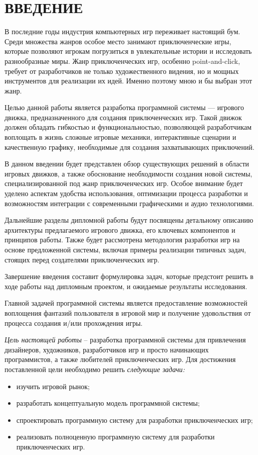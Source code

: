 \section*{ВВЕДЕНИЕ}

В последние годы индустрия компьютерных игр переживает настоящий бум. Среди множества жанров особое место занимают приключенческие игры, которые позволяют игрокам погрузиться в увлекательные истории и исследовать разнообразные миры. Жанр приключенческих игр, особенно point-and-click, требует от разработчиков не только художественного видения, но и мощных инструментов для реализации их идей. Именно поэтому мною и бы выбран этот жанр.

Целью данной работы является разработка программной системы — игрового движка, предназначенного для создания приключенческих игр. Такой движок должен обладать гибкостью и функциональностью, позволяющей разработчикам воплощать в жизнь сложные игровые механики, интерактивные сценарии и качественную графику, необходимые для создания захватывающих приключений.

В данном введении будет представлен обзор существующих решений в области игровых движков, а также обоснование необходимости создания новой системы, специализированной под жанр приключенческих игр. Особое внимание будет уделено аспектам удобства использования, оптимизации процесса разработки и возможностям интеграции с современными графическими и аудио технологиями.

Дальнейшие разделы дипломной работы будут посвящены детальному описанию архитектуры предлагаемого игрового движка, его ключевых компонентов и принципов работы. Также будет рассмотрена методология разработки игр на основе предложенной системы, включая примеры реализации типичных задач, стоящих перед создателями приключенческих игр.

Завершение введения составит формулировка задач, которые предстоит решить в ходе работы над дипломным проектом, и ожидаемые результаты исследования.

Главной задачей программной системы является предоставление возможностей воплощения фантазий пользователя в игровой мир и получение удовольствия от процесса создания и/или прохождения игры.

\emph{Цель настоящей работы} – разработка программной системы для привлечения дизайнеров, художников, разработчиков игр и просто начинающих программистов, а также любителей приключенческих игр. Для достижения поставленной цели необходимо решить \emph{следующие задачи:}
\begin{itemize}
\item изучить игровой рынок;
\item разработать концептуальную модель программной системы;
\item спроектировать программную систему для разработки приключенческих игр;
\item реализовать полноценную программную систему для разработки приключенческих игр.
\end{itemize}

